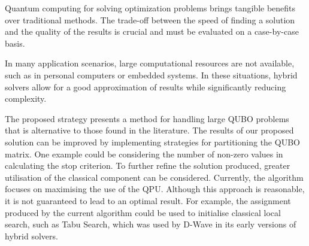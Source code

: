 \documentclass{ceurart}
\begin{document}
\begin{spacing}{1}
Quantum computing for solving optimization problems brings tangible benefits over traditional methods. The trade-off between the speed of finding a solution and the quality of the results is crucial and must be evaluated on a case-by-case basis.

In many application scenarios, large computational resources are not available, such as in personal computers or embedded systems. In these situations, hybrid solvers allow for a good approximation of results while significantly reducing complexity.

The proposed strategy presents a method for handling large QUBO problems that is alternative to those found in the literature\cite{subqubo1}\cite{subqubo2}. The results of our proposed solution can be improved by implementing strategies for partitioning the QUBO matrix. One example could be considering the number of non-zero values in calculating the stop criterion. To further refine the solution produced, greater utilisation of the classical component can be considered. Currently, the algorithm focuses on maximising the use of the QPU. Although this approach is reasonable, it is not guaranteed to lead to an optimal result. For example, the assignment produced by the current algorithm could be used to initialise classical local search, such as Tabu Search\cite{tabu}, which was used by D-Wave in its early versions of hybrid solvers\cite{dwavehybrid}.
\end{spacing}


\end{document}
